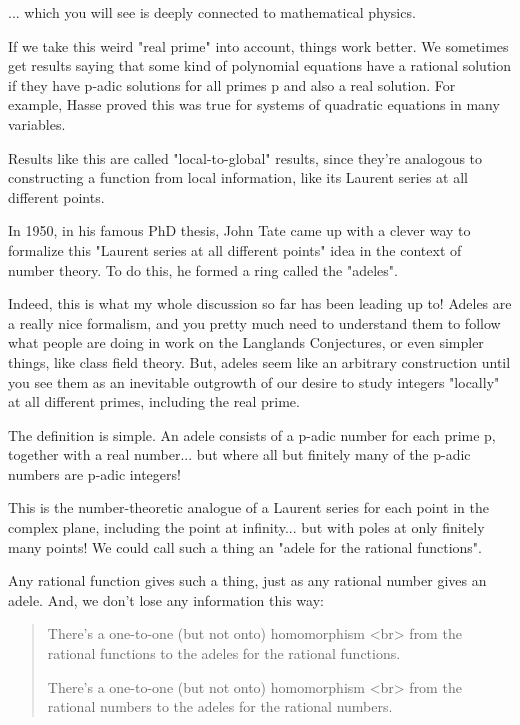... which you will see is deeply connected to mathematical physics.

If we take this weird "real prime" into account, things work better.  
We sometimes get results saying that some kind of polynomial equations 
have a rational solution if they have p-adic solutions for all primes p 
and also a real solution.  For example, Hasse proved this was true for 
systems of quadratic equations in many variables.

Results like this are called "local-to-global" results,
since they're analogous to constructing a function from local
information, like its Laurent series at all different points.

In 1950, in his famous PhD thesis, John Tate came up with a clever way to 
formalize this "Laurent series at all different points" idea in the context 
of number theory.  To do this, he formed a ring called the "adeles".  

Indeed, this is what my whole discussion so far has been leading up
to!  Adeles are a really nice formalism, and you pretty much need to
understand them to follow what people are doing in work on the
Langlands Conjectures, or even simpler things, like class field
theory.  But, adeles seem like an arbitrary construction until you see
them as an inevitable outgrowth of our desire to study integers
"locally" at all different primes, including the real prime.

The definition is simple.   An adele consists of a p-adic number for each 
prime p, together with a real number... but where all but finitely many 
of the p-adic numbers are p-adic integers!

This is the number-theoretic analogue of a Laurent series for each point in 
the complex plane, including the point at infinity... but with poles at only 
finitely many points!  We could call such a thing an "adele for the rational
functions".  

Any rational function gives such a thing, just as any rational number gives 
an adele.  And, we don't lose any information this way:

\begin{quote}
   There's a one-to-one (but not onto) homomorphism <br>
   from the rational functions to the adeles for the rational functions.

   There's a one-to-one (but not onto) homomorphism <br>
   from the rational numbers to the adeles for the rational numbers.
\end{quote}
    

